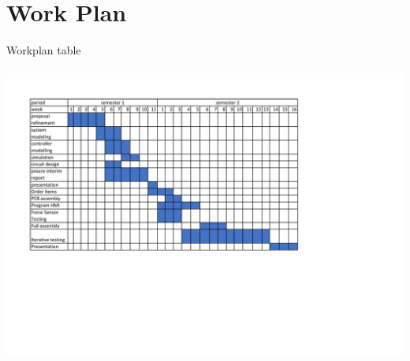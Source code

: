 \section{Work Plan}
\begin{center}
\begin{table}[!h]
\centering
\caption{Workplan table}
\paragraph{ }
\includegraphics[width=0.95\linewidth]{Figures/workplan}
\end{table}
\end{center}
